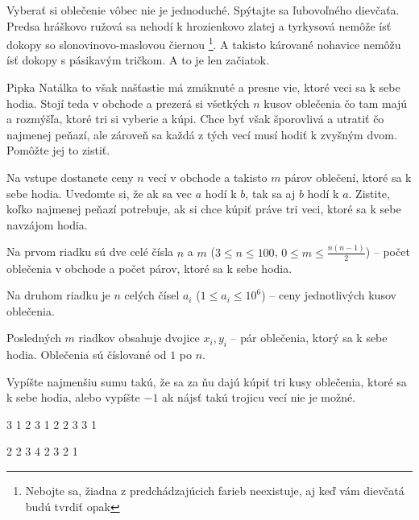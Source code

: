 




Vyberať si oblečenie vôbec nie je jednoduché. Spýtajte sa ľubovoľného dievčaťa. Predsa hráškovo
ružová sa nehodí k hrozienkovo zlatej a tyrkysová nemôže ísť dokopy so slonovinovo-maslovou čiernou
\footnote{Nebojte sa, žiadna z predchádzajúcich farieb neexistuje, aj keď vám dievčatá budú tvrdiť
opak}. A takisto kárované nohavice nemôžu ísť dokopy s pásikavým tričkom. A to je len začiatok.

Pipka Natálka to však našťastie má zmáknuté a presne vie, ktoré veci sa k sebe hodia. Stojí teda v
obchode a prezerá si všetkých $n$ kusov oblečenia čo tam majú a rozmýšľa, ktoré tri si vyberie a
kúpi. Chce byť však šporovlivá a utratiť čo najmenej peňazí, ale zároveň sa každá z tých vecí musí
hodiť k zvyšným dvom. Pomôžte jej to zistiť.


Na vstupe dostanete ceny $n$ vecí v obchode a takisto $m$ párov oblečení, ktoré sa k sebe hodia.
Uvedomte si, že ak sa vec $a$ hodí k $b$, tak sa aj $b$ hodí k $a$. Zistite, koľko najmenej peňazí
potrebuje, ak si chce kúpiť práve tri veci, ktoré sa k sebe navzájom hodia.


Na prvom riadku sú dve celé čísla $n$ a $m$ ($3 \leq n \leq 100$, $0 \leq m \leq \frac{n(n-1)}{2}$)
-- počet oblečenia v obchode a počet párov, ktoré sa k sebe hodia.

Na druhom riadku je $n$ celých čísel $a_i$ ($1 \leq a_i \leq 10^6$) -- ceny jednotlivých kusov oblečenia.

Posledných $m$ riadkov obsahuje dvojice $x_i, y_i$ -- pár oblečenia, ktorý sa k sebe hodia. Oblečenia
sú číslované od $1$ po $n$.


Vypíšte najmenšiu sumu takú, že sa za ňu dajú kúpiť tri kusy oblečenia, ktoré sa k sebe hodia, alebo
vypíšte $-1$ ak nájsť takú trojicu vecí nie je možné.


 3
1 2 3
1 2
2 3
3 1
\koniec

 2
2 3 4
2 3
2 1
\koniec


